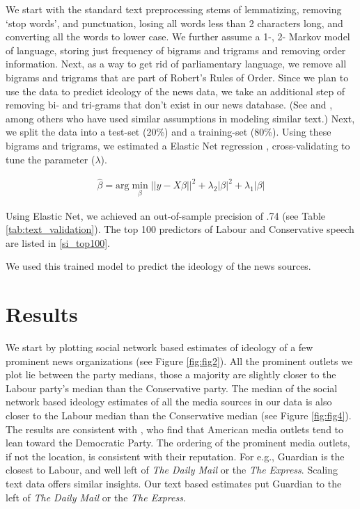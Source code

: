 \documentclass[12pt, letterpaper]{article}
\begin{document}
We start with the standard text preprocessing stems of lemmatizing, removing `stop words', and punctuation, losing all words less than 2 characters long, and converting all the words to lower case. We further assume a 1-, 2- Markov model of language, storing just frequency of bigrams and trigrams and removing order information. Next, as a way to get rid of parliamentary language, we remove all bigrams and trigrams that are part of Robert's Rules of Order. Since we plan to use the data to predict ideology of the news data, we take an additional step of removing bi- and tri-grams that don't exist in our news database. (See \citet{gentzkow2010} and \citet{martin2014}, among others who have used similar assumptions in modeling similar text.)  Next, we split the data into a test-set (20\%) and a training-set (80\%). Using these bigrams and trigrams, we estimated a Elastic Net regression \citep{zou2005regularization}, cross-validating to tune the parameter ($\lambda$).

\begin{align}
   \hat{\beta} = \text{arg} \min_{\beta} \lvert\lvert y - X\beta \rvert\rvert^2 + \lambda_2 \lvert\beta\rvert^2 + \lambda_1 \lvert\beta\rvert
\end{align}

Using Elastic Net, we achieved an out-of-sample precision of .74 (see Table \ref{tab:text_validation}). The top 100 predictors of Labour and Conservative speech are listed in \ref{si_top100}.  

\let\center\empty
\let\endcenter\relax
\begin{center}

\end{center}
We used this trained model to predict the ideology of the news sources. 

\section*{Results}

We start by plotting social network based estimates of ideology of a few prominent news organizations (see Figure \ref{fig:fig2}). All the prominent outlets we plot lie between the party medians, those a majority are slightly closer to the Labour party's median than the Conservative party. The median of the social network based ideology estimates of all the media sources in our data is also closer to the Labour median than the Conservative median (see Figure \ref{fig:fig4}). The results are consistent with \citet{barbera2016}, who find that American media outlets tend to lean toward the Democratic Party. The ordering of the prominent media outlets, if not the location, is consistent with their reputation. For e.g., Guardian is the closest to Labour, and well left of \emph{The Daily Mail} or the \emph{The Express}. Scaling text data offers similar insights. Our text based estimates put Guardian to the left of \emph{The Daily Mail} or the \emph{The Express}. 
 
\end{document}
